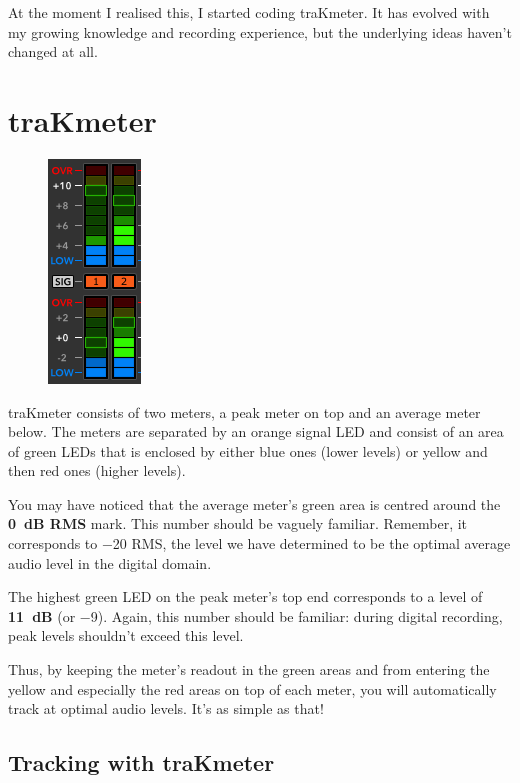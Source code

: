 At the moment I realised this, I started coding traKmeter.  It has
evolved with my growing knowledge and recording experience, but the
underlying ideas haven't changed at all.

\chapter{traKmeter}
\label{chap:trakmeter}

\begin{figure}
\includegraphics[scale=\screenshotscale,clip]{include/images/level_meter_complete.png}
\end{figure}

traKmeter consists of two meters, a peak meter on top and an average
meter below.  The meters are separated by an orange signal LED and
consist of an area of green LEDs that is enclosed by either blue ones
(lower levels) or yellow and then red ones (higher levels).

You may have noticed that the average meter's green area is centred
around the \textbf{\SI{0}{\dB} RMS} mark.  This number should be
vaguely familiar.  Remember, it corresponds to \SI{-20}{\dBFS} RMS,
the level we have determined to be the optimal average audio level in
the digital domain.

The highest green LED on the peak meter's top end corresponds to a
level of \textbf{\SI[retain-explicit-plus]{+11}{\dB}} (or
\SI{-9}{\dBFS}).  Again, this number should be familiar: during
digital recording, peak levels shouldn't exceed this level.

Thus, by keeping the meter's readout in the green areas and from
entering the yellow and especially the red areas on top of each meter,
you will automatically track at optimal audio levels.  It's as simple
as that!

\section{Tracking with traKmeter}
\label{sec:tracking_with_trakmeter}

